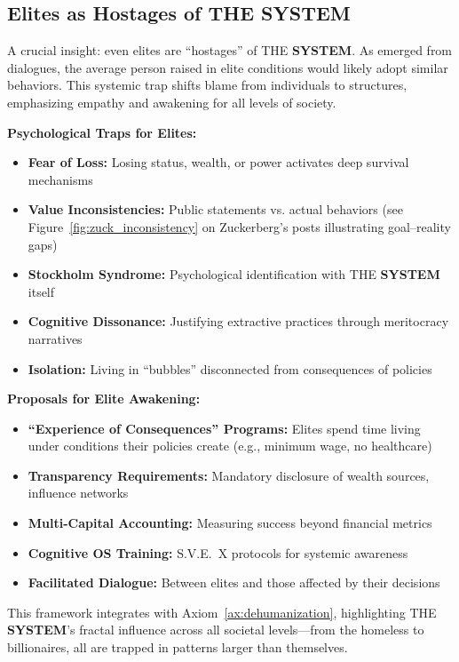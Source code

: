 \documentclass[11pt,a4paper]{article}
\newcommand{\SYSTEM}{\textbf{SYSTEM}}
\theoremstyle{definition}
\theoremstyle{remark}
\begin{document}
\subsection{Elites as Hostages of THE \SYSTEM{}}

A crucial insight: even elites are ``hostages'' of THE \SYSTEM{}. As emerged from dialogues, the average person raised in elite conditions would likely adopt similar behaviors. This systemic trap shifts blame from individuals to structures, emphasizing empathy and awakening for all levels of society.

\textbf{Psychological Traps for Elites:}
\begin{itemize}
    \item \textbf{Fear of Loss:} Losing status, wealth, or power activates deep survival mechanisms
    \item \textbf{Value Inconsistencies:} Public statements vs. actual behaviors (see Figure~\ref{fig:zuck_inconsistency} on Zuckerberg's posts illustrating goal--reality gaps)
    \item \textbf{Stockholm Syndrome:} Psychological identification with THE \SYSTEM{} itself
    \item \textbf{Cognitive Dissonance:} Justifying extractive practices through meritocracy narratives
    \item \textbf{Isolation:} Living in ``bubbles'' disconnected from consequences of policies
\end{itemize}

\textbf{Proposals for Elite Awakening:}
\begin{itemize}
    \item \textbf{``Experience of Consequences'' Programs:} Elites spend time living under conditions their policies create (e.g., minimum wage, no healthcare)
    \item \textbf{Transparency Requirements:} Mandatory disclosure of wealth sources, influence networks
    \item \textbf{Multi-Capital Accounting:} Measuring success beyond financial metrics
    \item \textbf{Cognitive OS Training:} S.V.E.~X protocols for systemic awareness
    \item \textbf{Facilitated Dialogue:} Between elites and those affected by their decisions
\end{itemize}

This framework integrates with Axiom~\ref{ax:dehumanization}, highlighting THE \SYSTEM{}'s fractal influence across all societal levels---from the homeless to billionaires, all are trapped in patterns larger than themselves.
\end{document}
